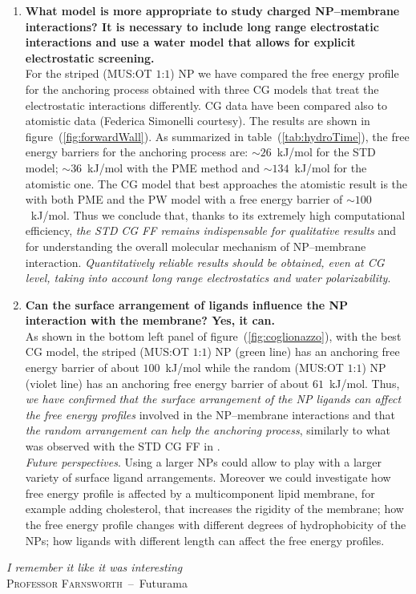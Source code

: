 \begin{enumerate}[label=\itshape\roman*.,listparindent=1em]
 	\item \textbf{\textsf{What model is more appropriate to study charged \ac{NP}--membrane interactions? It is necessary to include long range electrostatic interactions and use a water model that allows for explicit electrostatic screening.}}\\For the striped (\acs{MUS}:\acs{OT} $1$:$1$) \ac{NP} we have compared the free energy profile for the anchoring process obtained with three \ac{CG} models that treat the electrostatic interactions differently. \ac{CG} data have been compared also to atomistic data (Federica Simonelli courtesy). The results are shown in figure~(\ref{fig:forwardWall}). As summarized in table~(\ref{tab:hydroTime}), the free energy barriers for the anchoring process are: $\sim26$~kJ/mol for the \ac{STD} \martini{} model; $\sim36$~kJ/mol with the \ac{PME} method and $\sim134$~kJ/mol for the atomistic one. The \ac{CG} model that best approaches the atomistic result is the \martini{} with both \ac{PME} and the \ac{PW} model with a free energy barrier of $\sim100$~kJ/mol. Thus we conclude that, thanks to its extremely high computational efficiency, \textit{the \ac{STD}} \martini{} \textit{\ac{CG} \ac{FF} remains indispensable for qualitative results} and for understanding the overall molecular mechanism of \ac{NP}--membrane interaction. \textit{Quantitatively reliable results should be obtained, even at \ac{CG} level, taking into account long range electrostatics and water polarizability}.%

	\item \textbf{\textsf{Can the surface arrangement of ligands influence the \ac{NP} interaction with the membrane? Yes, it can.}}\\As shown in the bottom left panel of figure~(\ref{fig:coglionazzo}), with the best \ac{CG} model, the striped (\acs{MUS}:\acs{OT} $1$:$1$) \ac{NP} (green line) has an anchoring free energy barrier of about $100$~kJ/mol while the random (\acs{MUS}:\acs{OT} $1$:$1$) \ac{NP} (violet line) has an anchoring free energy barrier of about $61$~kJ/mol. Thus, \textit{we have confirmed that the surface arrangement of the \ac{NP} ligands can affect the free energy profiles} involved in the \ac{NP}--membrane interactions and that \textit{the random arrangement can help the anchoring process}, similarly to what was observed with the \ac{STD} \martini{} \ac{CG} \ac{FF} in \cite{ourPaper}.\\\indent\textit{Future perspectives}. Using a larger \acp{NP} could allow to play with a larger variety of surface ligand arrangements. Moreover we could investigate how free energy profile is affected by a multicomponent lipid membrane, for example adding cholesterol, that increases the rigidity of the membrane; how the free energy profile changes with different degrees of hydrophobicity of the \acp{NP}; how ligands with different length can affect the free energy profiles.%
\end{enumerate}

\vfill
\begin{flushright}
	\textsl{I remember it like it was interesting}\\\smallskip
	\footnotesize\textsc{\sffamily Professor Farnsworth}\ --\ \textsf{Futurama}
\end{flushright}
